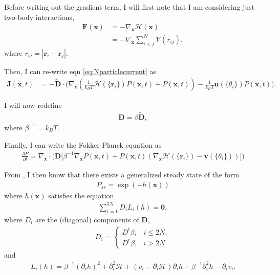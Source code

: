 \documentclass{article}
\begin{document}
Before writing out the gradient term, I will first note that I am considering just two-body
interactions,
\begin{align}\label{eq:general_conservative_force}
  \bm{F}(\bm{x})&=-\nabla_{\bm{x}}\mathcal{H}(\bm{x})\nonumber\\
                &=-\nabla_{\bm{x}}\sum_{i<j}^N\mathcal{V}(r_{ij}),
\end{align}
where $r_{ij}=|\bm{r}_i-\bm{r}_j|$.

Then, I can re-write eqn \ref{eq:Nparticlecurrent} as
\begin{align}\label{eq:Nparticlewithpotential}
  \bm{J}(\bm{x},t)&=-\bm{\tilde{D}}
                    \cdot\big(\nabla_{\bm{x}}(\frac{1}{k_BT}\mathcal{H}(\{\bm{r}_i\})
                    P(\bm{x},t)
                    +P(\bm{x},t))
                    -\frac{1}{k_BT}\bm{u}(\{\theta_i\})P(\bm{x},t)\big).
\end{align}

I will now redefine
\begin{align}
  \bm{D}=\beta\bm{\tilde{D}},
\end{align}
where $\beta^{-1}=k_BT$.


Finally, I can write the Fokker-Planck equation as
\begin{align}
  \frac{\partial P}{\partial t}=\nabla_{\bm{x}}\cdot\big(\bm{D}
  \big[\beta^{-1}\nabla_{\bm{x}}P(\bm{x},t)+P(\bm{x},t)(\nabla_{\bm{x}}
  \mathcal{H}(\{\bm{r}_i\})-\bm{v}(\{\theta_i\}))\big]\big)
\end{align}

From \cite{liverpool2018nonequilibrium}, I then know that there exists a generalized steady
state of the form
\begin{align}
  P_{ss}=\exp(-h(\bm{x}))
\end{align}
where $h(\bm{x})$ satisfies the equation
\begin{align}\label{eq:ss_condition}
  \sum_{i=1}^{3N}D_iL_i(h)=\bm{0},
\end{align}
where $D_i$ are the (diagonal) components of $\bm{D}$,
\begin{align}
  D_i =
  \begin{cases}
    D^t\beta,&i\leq 2N,\\
    D^r\beta,&i>2N
  \end{cases}
\end{align}
and
\begin{align}\label{eq:L_i}
  L_i(h) = \beta^{-1}(\partial_ih)^2+\partial_i^2\mathcal{H}
  +(v_i-\partial_i\mathcal{H})\partial_ih-\beta^{-1}\partial_i^2h-\partial_iv_i.
\end{align}
\end{document}

